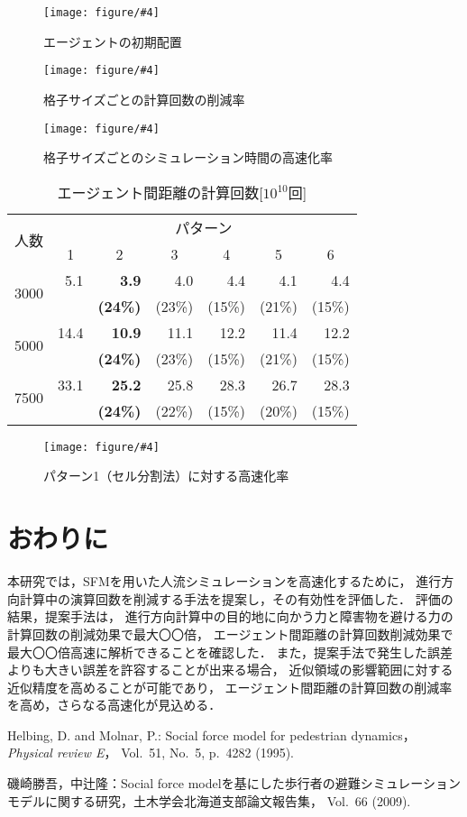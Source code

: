 \documentclass{maelab_y}
\newcommand{\figtb}[5]{ %
\begin{figure}[hbtp]
  \begin{center}
    \texttt{[image: figure/\#4]}
    \caption{#1}
    \label{fig:#5}
  \end{center}
\end{figure}
}%
\newcommand{\分類条件}{%
\begin{table}[t]
\begin{center}
\caption{進行方向を分類する条件}
\ecaption{Classification condition of moving direction $e_{i}$.}
\label{tb:hantei_jouken}
\begin{tabular}{c|c|c|c|c}
\hline \hline
			& 右 & 左 & 上 & 下 \\ \hline
パターン2   & $\frac{1}{\sqrt{2}} < e_x \leq 1  $
		    & $ -1 \leq e_x < \frac{-1}{\sqrt{2}}$ 
		    & $ \frac{-1}{\sqrt{2}} < e_x < \frac{1}{\sqrt{2}} $ 
		    & $ \frac{-1}{2} < e_x < \frac{1}{2} $ \\
パターン3   & $\frac{-1}{2} < e_y < \frac{1}{2} $ 
		    & $\frac{-1}{2} < e_y < \frac{1}{2} $
            & $ \frac{1}{\sqrt{2}} < e_y \leq 1$
		    & $ -1 \leq e_y < \frac{-1}{\sqrt{2}} $ \\
\hline
\multirow{2}{*}{パターン4}   
			& $R_x \geq A_x$ & $R_x < A_x$ & $R_y \geq A_y$ & $R_y < A_y $ \\
	        &  $L_x \geq A_x$ & $L_x < A_x$ & $L_y \geq A_y$ & $L_y < A_y$ \\
\hline
\multirow{2}{*}{パターン5}   
 			& $R_x \geq x_1$ & $R_x < x_2$ & $R_y \geq y_1$ & $R_y < y_2 $ \\
			& $L_x \geq x_1$ & $L_x < x_2$ & $L_y \geq y_1$ & $L_y < y_2 $ \\
\hline
パターン6   & $ \cos(\frac{1}{2}\theta_{view}) \leq  e_y $ 
			& $ e_y \leq -\cos(\frac{1}{2}\theta_{view})$ 
			& $ \sin(\frac{1}{2}(\pi - \theta_{view})) \leq e_x $ 
			& $ e_x \leq \sin(\frac{1}{2}(\pi - \theta_{view}))  $ \\
\hline
\end{tabular}
\end{center}
\end{table}
}%
\newcommand{\距離計算new}{%
  \begin{table}[hbtp]
    \begin{center}
    \caption{エージェント間距離の計算回数[$10^{10}$回]}
    \label{tb:keisan_kaisu}
    \begin{tabular}{c|llllll}
    \hline \hline
    \multirow{2}{*}{人数}   & \multicolumn{6}{c}{パターン}                                                                                                                                                             \\ \cline{2-7} 
                          & \multicolumn{1}{c|}{1}    & \multicolumn{1}{c|}{2}               & \multicolumn{1}{c|}{3}      & \multicolumn{1}{c|}{4}      & \multicolumn{1}{c|}{5}      & \multicolumn{1}{c}{6}    \\ \hline
    \multirow{2}{*}{3000} & \multicolumn{1}{r|}{5.1}  & \multicolumn{1}{r|}{\textbf{3.9}}    & \multicolumn{1}{r|}{4.0}    & \multicolumn{1}{r|}{4.4}    & \multicolumn{1}{r|}{4.1}    & \multicolumn{1}{r}{4.4}  \\
                          & \multicolumn{1}{l|}{}     & \multicolumn{1}{l|}{\textbf{(24\%)}} & \multicolumn{1}{l|}{(23\%)} & \multicolumn{1}{l|}{(15\%)} & \multicolumn{1}{l|}{(21\%)} & (15\%)                   \\ \hline
    \multirow{2}{*}{5000} & \multicolumn{1}{r|}{14.4} & \multicolumn{1}{r|}{\textbf{10.9}}   & \multicolumn{1}{r|}{11.1}   & \multicolumn{1}{r|}{12.2}   & \multicolumn{1}{r|}{11.4}   & \multicolumn{1}{r}{12.2} \\
                          & \multicolumn{1}{l|}{}     & \multicolumn{1}{l|}{\textbf{(24\%)}} & \multicolumn{1}{l|}{(23\%)} & \multicolumn{1}{l|}{(15\%)} & \multicolumn{1}{l|}{(21\%)} & (15\%)                   \\ \hline
    \multirow{2}{*}{7500} & \multicolumn{1}{r|}{33.1} & \multicolumn{1}{r|}{\textbf{25.2}}   & \multicolumn{1}{r|}{25.8}   & \multicolumn{1}{r|}{28.3}   & \multicolumn{1}{r|}{26.7}   & \multicolumn{1}{r}{28.3} \\
                          & \multicolumn{1}{l|}{}     & \multicolumn{1}{l|}{\textbf{(24\%)}} & \multicolumn{1}{l|}{(22\%)} & \multicolumn{1}{l|}{(15\%)} & \multicolumn{1}{l|}{(20\%)} & (15\%)                   \\ \hline
    \end{tabular}
    \end{center}
    \end{table}
}%
\newcommand{\粒子数}{%
\begin{table}[hbtp]
  \begin{center}
    \caption{各配置の詳細}
    \label{tb:haichi_para}
    \begin{tabular}{c|c|c}
      \hline \hline
      & 教室 & 演習室 \\ \hline 
      エージェント数[人] & 96 & 204 \\ \hline
      壁粒子数[個] & 1037 & 1454\\ \hline
      経由地数[個] & 12   & 26 \\ \hline
      解析領域 & $50m\times50m$ & $50m\times50m$ \\ \hline
    \end{tabular}
  \end{center}
\end{table}
}%
\newcommand{\評価環境}{%
\begin{table}[hbtp]
  \begin{center}
    \caption{各配置の詳細}
    \label{tb:haichi_para}
    \begin{tabular}{c|c|c}
      \hline \hline
                 & マシン1                & マシン2 \\ \hline 
      CPU        & Intel Xeon E5-2687W & Intel Xeon E5-2667W \\ \hline
      メモリ     & 64GB                   & 64GB \\ \hline
      OS         & Linux 4.12.9            & Linux 6.5.8 \\ \hline
      コンパイラ & gcc 7.2.0             & gcc 13.2.0 \\ \hline
    \end{tabular}
  \end{center}
\end{table}
}%
\newcommand{\判定条件new}{%
  \begin{table}[hbtp]
    \centering
		\caption{パターンごとの進行方向分類条件}
		\label{tb:joken}
		{\scriptsize
    \begin{tabular}{Wc{0.5em}|cccWc{8em}}
    \hline \hline
                          & \multicolumn{1}{c|}{パターン2，3} & \multicolumn{1}{c|}{パターン4}   & \multicolumn{1}{c|}{パターン5}   & パターン6                   \\ \hline
    \multirow{2}{*}{右}    & \multicolumn{1}{c|}{$\frac{1}{\sqrt{2}} < e_x \leq 1$}  & \multicolumn{1}{c|}{$R_x \geq A_x$}  & \multicolumn{1}{c|}{$R_x \geq x_1$}  & \multirow{2}{*}{$ \cos(\frac{1}{2}\theta_v) \leq  e_y $} \\
                          & \multicolumn{1}{c|}{$\frac{-1}{2} < e_y < \frac{1}{2} $}   & \multicolumn{1}{l|}{$L_x \geq A_x$} & \multicolumn{1}{l|}{$L_x \geq x_1$} &                     \\ \hline
    \multirow{2}{*}{左}    & \multicolumn{1}{c|}{$ -1 \leq e_x < \frac{-1}{\sqrt{2}}$}  & \multicolumn{1}{c|}{$R_x < A_x$}  & \multicolumn{1}{c|}{$R_x < x_2$}  & \multirow{2}{*}{$ e_y \leq -\cos(\frac{1}{2}\theta_{v})$} \\
                          & \multicolumn{1}{l|}{$\frac{-1}{2} < e_y < \frac{1}{2} $}   & \multicolumn{1}{l|}{$L_x < A_x$} & \multicolumn{1}{l|}{$L_x < x_2$ } &                     \\ \hline
    \multirow{2}{*}{上}    & \multicolumn{1}{c|}{$ \frac{-1}{\sqrt{2}} < e_x < \frac{1}{\sqrt{2}}$}  & \multicolumn{1}{c|}{$R_y \geq A_y$ }  & \multicolumn{1}{c|}{$R_y \geq y_1$ }  & \multirow{2}{*}{$ \sin(\frac{1}{2}(\theta_{\pi - v})) \leq e_x$} \\
                          & \multicolumn{1}{l|}{$ \frac{1}{\sqrt{2}} < e_y \leq 1$}   & \multicolumn{1}{l|}{$L_y \geq A_y$} & \multicolumn{1}{l|}{$L_y \geq y_1$} &                     \\ \hline
    \multirow{2}{*}{下}    & \multicolumn{1}{c|}{$ \frac{-1}{2} < e_x < \frac{1}{2} $}  & \multicolumn{1}{c|}{$R_y < A_y $}  & \multicolumn{1}{c|}{$R_y < y_2 $ }  & \multirow{2}{*}{$ e_x \leq \sin(\frac{1}{2}(\theta_{\pi - v}))$} \\
                          & \multicolumn{1}{l|}{$ -1 \leq e_y < \frac{-1}{\sqrt{2}} $}   & \multicolumn{1}{l|}{$L_y < A_y$} & \multicolumn{1}{l|}{$L_y < y_2 $ } &                     \\ \hline
    \end{tabular}
		}
    \end{table}
}%
\begin{document}
\figtb{エージェントの初期配置}{Initial position of agents.}{8}{agent_position.eps}{agent_haichi}

\figtb{格子サイズごとの計算回数の削減率}{}{8.0}{haba_sakugenritu2.eps}{haba_sakugenritu}
\figtb{格子サイズごとのシミュレーション時間の高速化率}{}{8.0}{haba_kousokuka.eps}{haba_kousokuka}

\距離計算new
\figtb{パターン1（セル分割法）に対する高速化率}{}{8}{20230226_kousokuka.eps}{kousokuka2}

\section{おわりに}
本研究では，SFMを用いた人流シミュレーションを高速化するために，
進行方向計算中の演算回数を削減する手法を提案し，その有効性を評価した．
評価の結果，提案手法は，
進行方向計算中の目的地に向かう力と障害物を避ける力の計算回数の削減効果で最大〇〇倍，
エージェント間距離の計算回数削減効果で最大〇〇倍高速に解析できることを確認した．
また，提案手法で発生した誤差よりも大きい誤差を許容することが出来る場合，
近似領域の影響範囲に対する近似精度を高めることが可能であり，
エージェント間距離の計算回数の削減率を高め，さらなる高速化が見込める．


\begin{thebibliography}{9}
\footnotesize
{}
  Helbing, D. and Molnar, P.: Social force model for pedestrian dynamics，{\em
    Physical review E}， Vol.~51, No.~5, p.\ 4282 (1995).

  磯崎勝吾，中辻隆：Social force
  modelを基にした歩行者の避難シミュレーションモデルに関する研究，土木学会北海道支部論文報告集，
  Vol.~66 (2009).
\end{thebibliography}
\end{document}

